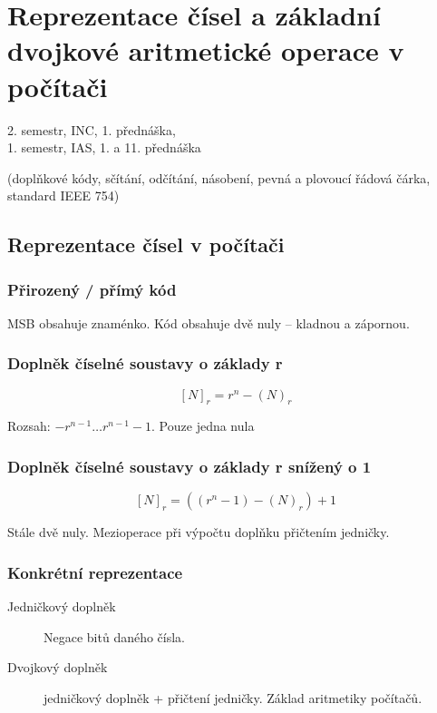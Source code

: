 \documentclass[a4wide]{report}
\begin{document}
\setcounter{chapter}{8}
\chapter{Reprezentace čísel a základní dvojkové aritmetické operace v počítači} \label{cha:9}

2. semestr, INC, 1. přednáška,\\
1. semestr, IAS, 1. a 11. přednáška

(doplňkové kódy, sčítání, odčítání, násobení, pevná a plovoucí řádová čárka, standard IEEE 754)

\section{Reprezentace čísel v počítači}

\subsection{Přirozený / přímý kód}

MSB obsahuje znaménko. Kód obsahuje dvě nuly -- kladnou a zápornou.

\subsection{Doplněk číselné soustavy o základy r}

$$ [N]_r = r^n - (N)_r $$

Rozsah: $ -r^{n-1} \dots r^{n-1} - 1 $. Pouze jedna nula

\subsection{Doplněk číselné soustavy o základy r snížený o 1}

$$ [N]_r = ((r^n -1) - (N)_r)+1$$

Stále dvě nuly. Mezioperace při výpočtu doplňku přičtením jedničky.

\subsection{Konkrétní reprezentace}
\begin{description}
	\item[Jedničkový doplněk] Negace bitů daného čísla.
	\item[Dvojkový doplněk] jedničkový doplněk + přičtení jedničky. Základ aritmetiky počítačů.
\end{description}
\end{document}
